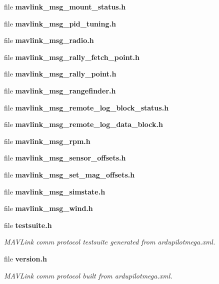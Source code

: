 \begin{DoxyCompactItemize}
\item 
file \textbf{ mavlink\+\_\+msg\+\_\+mount\+\_\+status.\+h}
\item 
file \textbf{ mavlink\+\_\+msg\+\_\+pid\+\_\+tuning.\+h}
\item 
file \textbf{ mavlink\+\_\+msg\+\_\+radio.\+h}
\item 
file \textbf{ mavlink\+\_\+msg\+\_\+rally\+\_\+fetch\+\_\+point.\+h}
\item 
file \textbf{ mavlink\+\_\+msg\+\_\+rally\+\_\+point.\+h}
\item 
file \textbf{ mavlink\+\_\+msg\+\_\+rangefinder.\+h}
\item 
file \textbf{ mavlink\+\_\+msg\+\_\+remote\+\_\+log\+\_\+block\+\_\+status.\+h}
\item 
file \textbf{ mavlink\+\_\+msg\+\_\+remote\+\_\+log\+\_\+data\+\_\+block.\+h}
\item 
file \textbf{ mavlink\+\_\+msg\+\_\+rpm.\+h}
\item 
file \textbf{ mavlink\+\_\+msg\+\_\+sensor\+\_\+offsets.\+h}
\item 
file \textbf{ mavlink\+\_\+msg\+\_\+set\+\_\+mag\+\_\+offsets.\+h}
\item 
file \textbf{ mavlink\+\_\+msg\+\_\+simstate.\+h}
\item 
file \textbf{ mavlink\+\_\+msg\+\_\+wind.\+h}
\item 
file \textbf{ testsuite.\+h}
\begin{DoxyCompactList}\small\item\em M\+A\+V\+Link comm protocol testsuite generated from ardupilotmega.\+xml. \end{DoxyCompactList}\item 
file \textbf{ version.\+h}
\begin{DoxyCompactList}\small\item\em M\+A\+V\+Link comm protocol built from ardupilotmega.\+xml. \end{DoxyCompactList}\end{DoxyCompactItemize}
